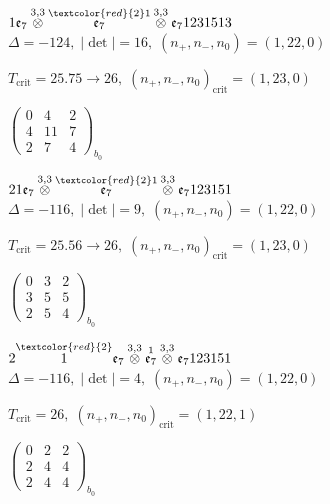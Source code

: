 \documentclass[10pt]{article}
\begin{document}
\smallskip

$1\mathfrak{e}_7\overset{3,3}{\otimes}\overset{\textcolor{red}{2}1}{\mathfrak{e}_7}\overset{3,3}{\otimes}\mathfrak{e}_71231513$ \quad $\Delta=-124,\; |\det|=16,\; (n_+,n_-,n_0)=(1,22,0)$

\hspace{1em}$T_{\text{crit}}=25.75 \to 26,\; (n_+,n_-,n_0)_{\text{crit}}=(1,23,0)$

\hspace{2em}$\left(\begin{smallmatrix}0 & 4 & 2 \\ 4 & 11 & 7 \\ 2 & 7 & 4\end{smallmatrix}\right)_{\!b_0}$

\smallskip

$21\mathfrak{e}_7\overset{3,3}{\otimes}\overset{\textcolor{red}{2}1}{\mathfrak{e}_7}\overset{3,3}{\otimes}\mathfrak{e}_7123151$ \quad $\Delta=-116,\; |\det|=9,\; (n_+,n_-,n_0)=(1,22,0)$

\hspace{1em}$T_{\text{crit}}=25.56 \to 26,\; (n_+,n_-,n_0)_{\text{crit}}=(1,23,0)$

\hspace{2em}$\left(\begin{smallmatrix}0 & 3 & 2 \\ 3 & 5 & 5 \\ 2 & 5 & 4\end{smallmatrix}\right)_{\!b_0}$

$2\overset{\textcolor{red}{2}}{1}\mathfrak{e}_7\overset{3,3}{\otimes}\overset{1}{\mathfrak{e}_7}\overset{3,3}{\otimes}\mathfrak{e}_7123151$ \quad $\Delta=-116,\; |\det|=4,\; (n_+,n_-,n_0)=(1,22,0)$

\hspace{1em}$T_{\text{crit}}=26,\; (n_+,n_-,n_0)_{\text{crit}}=(1,22,1)$

\hspace{2em}$\left(\begin{smallmatrix}0 & 2 & 2 \\ 2 & 4 & 4 \\ 2 & 4 & 4\end{smallmatrix}\right)_{\!b_0}$
\end{document}
